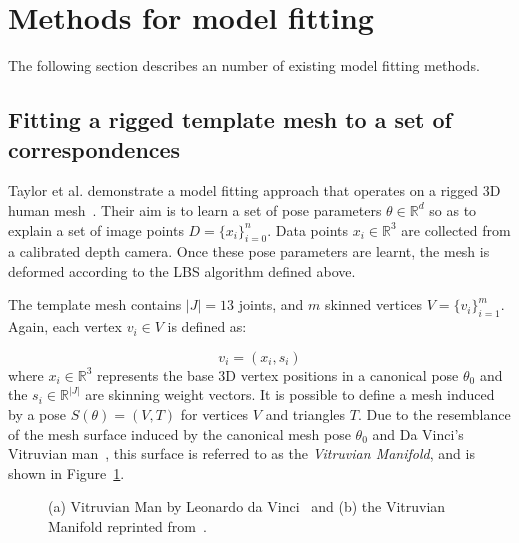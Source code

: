 \section{Methods for model fitting}
The following section describes an number of existing model fitting methods.

\subsection{Fitting a rigged template mesh to a set of correspondences}
Taylor et al. demonstrate a model fitting approach that operates on a rigged 3D human mesh~\cite{taylor2012vitruvian}. Their aim is to learn a set of pose parameters $\theta \in \mathbb{R}^{d}$ so as to explain a set of image points $D = \{x_{i}\}_{i=0}^{n}$. Data points $x_{i} \in \mathbb{R}^{3}$ are collected from a calibrated depth camera. Once these pose parameters are learnt, the mesh is deformed according to the LBS algorithm defined above.

The template mesh contains $|J| = 13$ joints, and $m$ skinned vertices ${V} = \{v_{i}\}_{i=1}^{m}$. Again, each vertex $v_{i} \in V$ is defined as:

\begin{equation}
    v_{i} = (x_{i}, s_{i})
\end{equation}
where $x_{i} \in \mathbb{R}^{3}$ represents the base 3D vertex positions in a canonical pose $\theta_{0}$ and the $s_{i} \in \mathbb{R}^{|J|}$ are skinning weight vectors. It is possible to define a mesh induced by a pose $S(\theta) = (V, T)$ for vertices $V$ and triangles $T$. Due to the resemblance of the mesh surface induced by the canonical mesh pose $\theta_{0}$ and Da Vinci's Vitruvian man~\cite{davinci}, this surface is referred to as the \emph{Vitruvian Manifold}, and is shown in Figure~\ref{fig:vitruvian_man}. 

\begin{figure}[H] %
    \caption{(a) Vitruvian Man by Leonardo da Vinci~\cite{davinci} and (b) the Vitruvian Manifold reprinted from~\cite{taylor2012vitruvian}.}
    \label{fig:vitruvian_man}
\end{figure}

